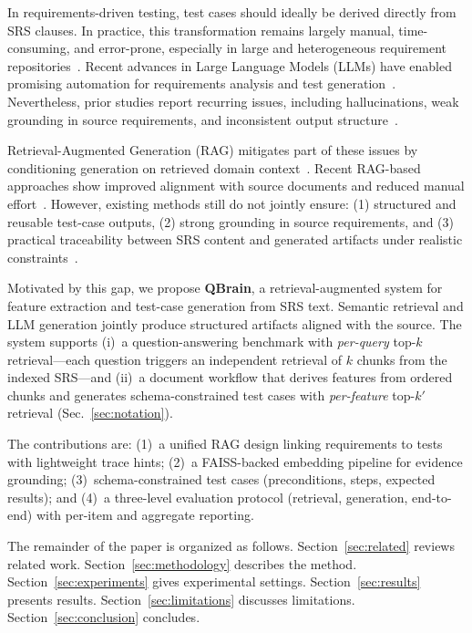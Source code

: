 \documentclass[conference]{IEEEtran}
\begin{document}
In requirements-driven testing, test cases should ideally be derived directly from SRS clauses. In practice, this transformation remains largely manual, time-consuming, and error-prone, especially in large and heterogeneous requirement repositories~\cite{wang2025,RE2025SurveyRBTG}. Recent advances in Large Language Models (LLMs) have enabled promising automation for requirements analysis and test generation~\cite{hou2024llm4se,brown2020}. Nevertheless, prior studies report recurring issues, including hallucinations, weak grounding in source requirements, and inconsistent output structure~\cite{ji2023,RE2025SurveyRBTG}.

Retrieval-Augmented Generation (RAG) mitigates part of these issues by conditioning generation on retrieved domain context~\cite{lewis2020}. Recent RAG-based approaches show improved alignment with source documents and reduced manual effort~\cite{arora2024,RE2025RAGinSE}. However, existing methods still do not jointly ensure: (1) structured and reusable test-case outputs, (2) strong grounding in source requirements, and (3) practical traceability between SRS content and generated artifacts under realistic constraints~\cite{Ghosh2023NLPTestCases,Khurshid2021AutomatedTCG,Kumar2025NLRequirements,RE2025SurveyRBTG,RE2025RAGinSE}.

Motivated by this gap, we propose \textbf{QBrain}, a retrieval-augmented system for feature extraction and test-case generation from SRS text. Semantic retrieval and LLM generation jointly produce structured artifacts aligned with the source. The system supports (i)~a question-answering benchmark with \emph{per-query} top-$k$ retrieval---each question triggers an independent retrieval of $k$ chunks from the indexed SRS---and (ii)~a document workflow that derives features from ordered chunks and generates schema-constrained test cases with \emph{per-feature} top-$k'$ retrieval (Sec.~\ref{sec:notation}).

The contributions are: (1)~a unified RAG design linking requirements to tests with lightweight trace hints; (2)~a FAISS-backed embedding pipeline for evidence grounding; (3)~schema-constrained test cases (preconditions, steps, expected results); and (4)~a three-level evaluation protocol (retrieval, generation, end-to-end) with per-item and aggregate reporting.

The remainder of the paper is organized as follows. Section~\ref{sec:related} reviews related work. Section~\ref{sec:methodology} describes the method. Section~\ref{sec:experiments} gives experimental settings. Section~\ref{sec:results} presents results. Section~\ref{sec:limitations} discusses limitations. Section~\ref{sec:conclusion} concludes.
\end{document}
